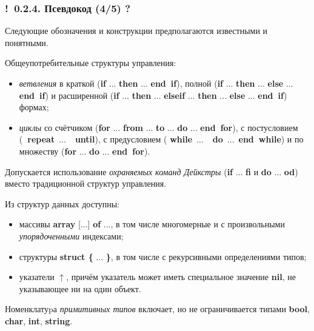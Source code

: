 \documentclass[mathserif,12pt,aspectratio=169]{beamer}
\def\emразделенной{\em разделенной}
\def\em#1{\it\color{blue}#1}
\def\Ok{{\color{green}\textbf{!}\ }}
\def\Qm{{\color{brown}\textbf{?}\ }}
\begin{document}
\begin{frame}
\frametitle{\Ok 0.2.4. Псевдокод (4/5) \Qm}
Следующие обозначения и конструкции предполагаются известными и понятными.

\smallskip
Общеупотребительные структуры
управления:

\begin{itemize}
\item
 {\em ветвления} в краткой ({\bf if} ... {\bf then} ... {\bf
end~if}), полной ({\bf if} ... {\bf then} ... {\bf else} ... {\bf
end~if}) и
 расширенной ({\bf if} ... {\bf then} ... 
 {\bf elseif} ... {\bf then} ...
  {\bf else} ... {\bf
end~if}) формах; 
\item {\em циклы} со счётчиком ({\bf for} ... {\bf from} ...
{\bf to} ... {\bf do}
 ... {\bf end~for}), с постусловием
({\bf~repeat}~...~{\bf~until}), с предусловием \linebreak[3]({\bf
while}~...~{\bf~do}~...~{\bfseries end~while}) и по множеству
({\bf for} ... {\bf do} ... {\bf end~for}).
\end{itemize}

\begin{remark}
Допускается использование  {\em охраняемых команд Дейкстры} 
({\bf if} ... {\bf fi} и {\bf do} ... {\bf od}) вместо традиционной структур управления.
\end{remark}

Из структур данных доступны:
\begin{itemize}
\item массивы {\bf array} [...]
{\bf of} ...,  в том числе многомерные и с произвольными 
{\em упорядоченными} индексами; 
\item 
структуры {\bf struct \{ } ... {\bf \}}, в том числе с рекурсивными определениями типов; 
\item
указатели $\uparrow$, причём
указатель может иметь специальное значение
{\bf nil}, не указывающее ни на один объект.
\end{itemize}

\begin{remark}
Номенклатуpа   {\em примитивных типов} включает, но не ограничивается типами 
{\bf bool}, {\bf char}, {\bf int}, {\bf string}.
\end{remark}

\end{frame}
\end{document}

